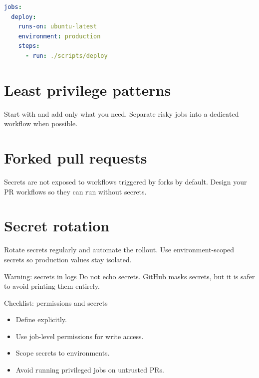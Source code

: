 \begin{lstlisting}[language=YAML]
jobs:
  deploy:
    runs-on: ubuntu-latest
    environment: production
    steps:
      - run: ./scripts/deploy
\end{lstlisting}

\section{Least privilege patterns}
Start with  and add only what you need.
Separate risky jobs into a dedicated workflow when possible.

\section{Forked pull requests}
Secrets are not exposed to workflows triggered by forks by default.
Design your PR workflows so they can run without secrets.

\section{Secret rotation}
Rotate secrets regularly and automate the rollout.
Use environment-scoped secrets so production values stay isolated.

\begin{warningbox}{Warning: secrets in logs}
Do not echo secrets.
GitHub masks secrets, but it is safer to avoid printing them entirely.
\end{warningbox}

\begin{checklistbox}{Checklist: permissions and secrets}
\begin{itemize}[nosep]
  \item Define  explicitly.
  \item Use job-level permissions for write access.
  \item Scope secrets to environments.
  \item Avoid running privileged jobs on untrusted PRs.
\end{itemize}
\end{checklistbox}
